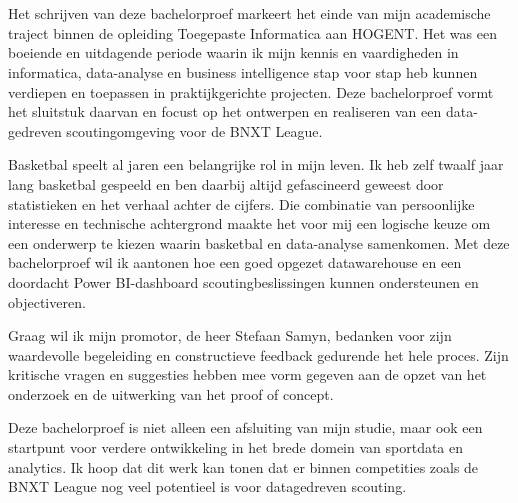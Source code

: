 
\chapter*{}%
\label{ch:voorwoord}


Het schrijven van deze bachelorproef markeert het einde van mijn academische traject binnen de opleiding Toegepaste Informatica aan HOGENT. Het was een boeiende en uitdagende periode waarin ik mijn kennis en vaardigheden in informatica, data-analyse en business intelligence stap voor stap heb kunnen verdiepen en toepassen in praktijkgerichte projecten. Deze bachelorproef vormt het sluitstuk daarvan en focust op het ontwerpen en realiseren van een data-gedreven scoutingomgeving voor de BNXT League.

Basketbal speelt al jaren een belangrijke rol in mijn leven. Ik heb zelf twaalf jaar lang basketbal gespeeld en ben daarbij altijd gefascineerd geweest door statistieken en het verhaal achter de cijfers. Die combinatie van persoonlijke interesse en technische achtergrond maakte het voor mij een logische keuze om een onderwerp te kiezen waarin basketbal en data-analyse samenkomen. Met deze bachelorproef wil ik aantonen hoe een goed opgezet datawarehouse en een doordacht Power BI-dashboard scoutingbeslissingen kunnen ondersteunen en objectiveren.

Graag wil ik mijn promotor, de heer Stefaan Samyn, bedanken voor zijn waardevolle begeleiding en constructieve feedback gedurende het hele proces. Zijn kritische vragen en suggesties hebben mee vorm gegeven aan de opzet van het onderzoek en de uitwerking van het proof of concept.

Deze bachelorproef is niet alleen een afsluiting van mijn studie, maar ook een startpunt voor verdere ontwikkeling in het brede domein van sportdata en analytics. Ik hoop dat dit werk kan tonen dat er binnen competities zoals de BNXT League nog veel potentieel is voor datagedreven scouting.

